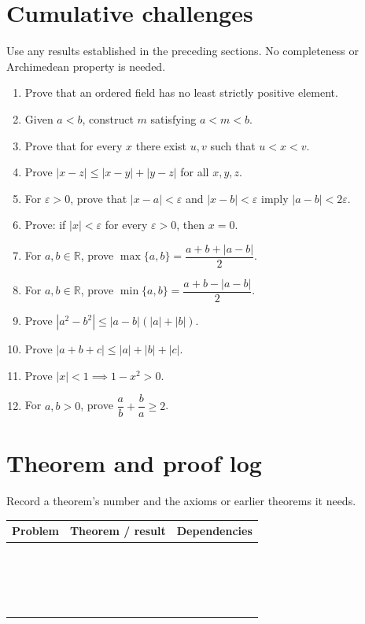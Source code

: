 \documentclass{workbook}
\newif\ifroomforwork
\newcommand{\ex}[1]{\item #1\ifroomforwork\par\vspace{4\baselineskip}\fi}
\newenvironment{exercises}{%
  \begin{enumerate}[label=\textbf{\thesection.\arabic*},
    leftmargin=*,itemsep=.52\baselineskip,topsep=.35\baselineskip]
}{\end{enumerate}}
\begin{document}
\section{Cumulative challenges}
Use any results established in the preceding sections. No completeness or
Archimedean property is needed.
\begin{exercises}
\ex{Prove that an ordered field has no least strictly positive element.}
\ex{Given $a<b$, construct $m$ satisfying $a<m<b$.}
\ex{Prove that for every $x$ there exist $u,v$ such that $u<x<v$.}
\ex{Prove $|x-z|\le|x-y|+|y-z|$ for all $x,y,z$.}
\ex{For $\varepsilon>0$, prove that $|x-a|<\varepsilon$ and
$|x-b|<\varepsilon$ imply $|a-b|<2\varepsilon$.}
\ex{Prove: if $|x|<\varepsilon$ for every $\varepsilon>0$, then $x=0$.}
\ex{For $a,b\in\mathbb R$, prove
$\max\{a,b\}=\dfrac{a+b+|a-b|}{2}$.}
\ex{For $a,b\in\mathbb R$, prove
$\min\{a,b\}=\dfrac{a+b-|a-b|}{2}$.}
\ex{Prove $|a^2-b^2|\le|a-b|(|a|+|b|)$.}
\ex{Prove $|a+b+c|\le|a|+|b|+|c|$.}
\ex{Prove $|x|<1\implies1-x^2>0$.}
\ex{For $a,b>0$, prove $\dfrac{a}{b}+\dfrac{b}{a}\ge2$.}
\end{exercises}

\clearpage
\section*{Theorem and proof log}
Record a theorem's number and the axioms or earlier theorems it needs.
\par\medskip\noindent
\renewcommand{\arraystretch}{2.1}
\begin{tabular}{|p{.11\linewidth}|p{.36\linewidth}|p{.42\linewidth}|}
\hline
\textbf{Problem} & \textbf{Theorem / result} & \textbf{Dependencies} \\ \hline
\rule{0pt}{2.1ex} & & \\ \hline
\rule{0pt}{2.1ex} & & \\ \hline
\rule{0pt}{2.1ex} & & \\ \hline
\rule{0pt}{2.1ex} & & \\ \hline
\rule{0pt}{2.1ex} & & \\ \hline
\rule{0pt}{2.1ex} & & \\ \hline
\rule{0pt}{2.1ex} & & \\ \hline
\rule{0pt}{2.1ex} & & \\ \hline
\rule{0pt}{2.1ex} & & \\ \hline
\rule{0pt}{2.1ex} & & \\ \hline
\rule{0pt}{2.1ex} & & \\ \hline
\rule{0pt}{2.1ex} & & \\ \hline
\rule{0pt}{2.1ex} & & \\ \hline
\rule{0pt}{2.1ex} & & \\ \hline
\rule{0pt}{2.1ex} & & \\ \hline
\rule{0pt}{2.1ex} & & \\ \hline
\rule{0pt}{2.1ex} & & \\ \hline
\rule{0pt}{2.1ex} & & \\ \hline
\end{tabular}
\end{document}
